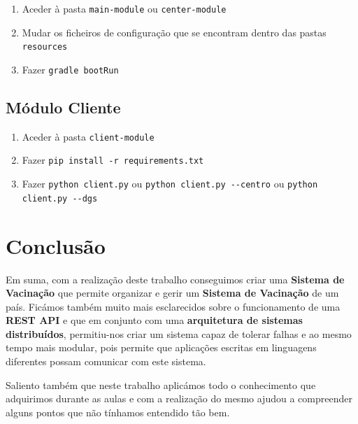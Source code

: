 \documentclass[11pt]{article}
\begin{document}
\begin{enumerate}
    \item Aceder à pasta \verb|main-module| ou \verb|center-module|
    \item Mudar os ficheiros de configuração que se encontram dentro das pastas \verb|resources|
    \item Fazer \verb|gradle bootRun|
\end{enumerate}

\subsection{Módulo Cliente}

\begin{enumerate}
    \item Aceder à pasta \verb|client-module|
    \item Fazer \verb|pip install -r requirements.txt|
    \item Fazer \verb|python client.py| ou \verb|python client.py --centro| ou \verb|python client.py --dgs|
\end{enumerate}

\section{Conclusão}

\hspace{0.5cm}Em suma, com a realização deste trabalho conseguimos criar uma \textbf{Sistema de Vacinação} que permite organizar e gerir um \textbf{Sistema de Vacinação} de um país. Ficámos também muito mais esclarecidos sobre o funcionamento de uma \textbf{REST API} e que em conjunto com uma \textbf{arquitetura de sistemas distribuídos}, permitiu-nos criar um sistema capaz de tolerar falhas e ao mesmo tempo mais modular, pois permite que aplicações escritas em linguagens diferentes possam comunicar com este sistema.

Saliento também que neste trabalho aplicámos todo o conhecimento que adquirimos durante as aulas e com a realização do mesmo ajudou a compreender alguns pontos que não tínhamos entendido tão bem.
\end{document}
